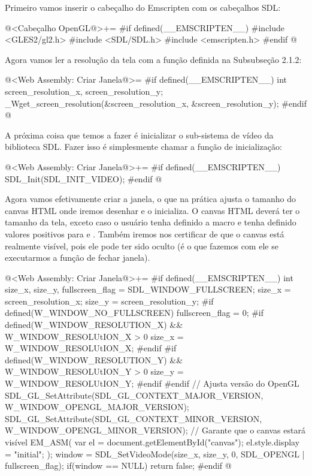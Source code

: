 Primeiro vamos inserir o cabeçalho do Emscripten com os cabeçalhos SDL:

\iniciocodigo
@<Cabeçalho OpenGL@>+=
#if defined(__EMSCRIPTEN__)
#include <GLES2/gl2.h>
#include <SDL/SDL.h>
#include <emscripten.h>
#endif
@
\fimcodigo

Agora vamos ler a resolução da tela com a função definida na Subsubseção 2.1.2:

\iniciocodigo
@<Web Assembly: Criar Janela@>=
#if defined(__EMSCRIPTEN__)
int screen_resolution_x, screen_resolution_y;
_Wget_screen_resolution(&screen_resolution_x, &screen_resolution_y);
#endif
@
\fimcodigo

A próxima coisa que temos a fazer é inicializar o sub-sistema de vídeo
da biblioteca SDL. Fazer isso é simplesmente chamar a função de
inicialização:

\iniciocodigo
@<Web Assembly: Criar Janela@>+=
#if defined(__EMSCRIPTEN__)
SDL_Init(SDL_INIT_VIDEO);
#endif
@
\fimcodigo

Agora vamos efetivamente criar a janela, o que na prática ajusta o
tamanho do canvas HTML onde iremos desenhar e o inicializa. O canvas
HTML deverá ter o tamanho da tela, exceto caso o usuário tenha
definido a macro  e tenha
definido valores positivos para 
e . Também iremos nos certificar
de que o canvas está realmente visível, pois ele pode ter sido oculto
(é o que fazemos com ele se executarmos a função de fechar janela).

\iniciocodigo
@<Web Assembly: Criar Janela@>+=
#if defined(__EMSCRIPTEN__)
{
  int size_x, size_y, fullscreen_flag = SDL_WINDOW_FULLSCREEN;
  size_x = screen_resolution_x;
  size_y = screen_resolution_y;
#if defined(W_WINDOW_NO_FULLSCREEN)
  fullscreen_flag = 0;
#if defined(W_WINDOW_RESOLUTION_X) && W_WINDOW_RESOLUtION_X > 0
  size_x = W_WINDOW_RESOLUtION_X;
#endif
#if defined(W_WINDOW_RESOLUTION_Y) && W_WINDOW_RESOLUtION_Y > 0
  size_y = W_WINDOW_RESOLUtION_Y;
#endif
#endif
  // Ajusta versão do OpenGL
  SDL_GL_SetAttribute(SDL_GL_CONTEXT_MAJOR_VERSION,
                     W_WINDOW_OPENGL_MAJOR_VERSION);
  SDL_GL_SetAttribute(SDL_GL_CONTEXT_MINOR_VERSION,
                     W_WINDOW_OPENGL_MINOR_VERSION);
  // Garante que o canvas estará visível
  EM_ASM(
    var el = document.getElementById("canvas");
    el.style.display = "initial";
  );
  window = SDL_SetVideoMode(size_x, size_y, 0,
                            SDL_OPENGL | fullscreen_flag);
  if(window == NULL)
    return false;
}
#endif
@
\fimcodigo

